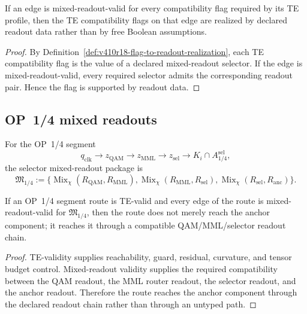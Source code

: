 \begin{lemma}
\label{lem:v410r18-mixed-readout-validity-refines-te-validity}
If an edge is mixed-readout-valid for every compatibility flag required by its
TE profile, then the TE compatibility flags on that edge are realized by
declared readout data rather than by free Boolean assumptions.
\end{lemma}

\begin{proof}
By Definition~\ref{def:v410r18-flag-to-readout-realization}, each TE
compatibility flag is the value of a declared mixed-readout selector. If the
edge is mixed-readout-valid, every required selector admits the corresponding
readout pair. Hence the flag is supported by readout data.
\end{proof}

\subsection{OP~1/4 mixed readouts}
\label{subsec:v410r18-op14-mixed-readouts}

\begin{definition}
\label{def:v410r18-op14-selector-mixed-readout-package}
For the OP~1/4 segment
\[
 q_{\mathrm{clk}}\to z_{\mathrm{QAM}}\to z_{\mathrm{MML}}\to
 z_{\mathrm{sel}}\to K_i\cap A_{1/4}^{\mathrm{sel}},
\]
the selector mixed-readout package is
\[
 \mathfrak M_{1/4}
 :=
 \{
 \operatorname{Mix}_{\chi}(R_{\mathrm{QAM}},R_{\mathrm{MML}}),
 \operatorname{Mix}_{\chi}(R_{\mathrm{MML}},R_{\mathrm{sel}}),
 \operatorname{Mix}_{\chi}(R_{\mathrm{sel}},R_{\mathrm{anc}})
 \}.
\]
\end{definition}

\begin{proposition}
\label{prop:v410r18-op14-mixed-readout-refinement}
If an OP~1/4 segment route is TE-valid and every edge of the route is
mixed-readout-valid for \(\mathfrak M_{1/4}\), then the route does not merely
reach the anchor component; it reaches it through a compatible QAM/MML/selector
readout chain.
\end{proposition}

\begin{proof}
TE-validity supplies reachability, guard, residual, curvature, and tensor
budget control. Mixed-readout validity supplies the required compatibility
between the QAM readout, the MML router readout, the selector readout, and the
anchor readout. Therefore the route reaches the anchor component through the
declared readout chain rather than through an untyped path.
\end{proof}

